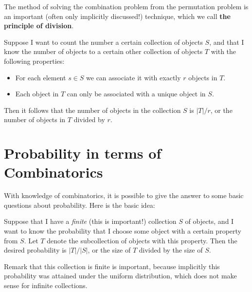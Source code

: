The method of solving the combination problem from the permutation problem is an important (often only implicitly discussed!) technique, which we call \textbf{the principle of division}.

\begin{tcolorbox}
 Suppose I want to count the number a certain collection of objects $S$, and that I know the number of objects to a certain other collection of objects $T$ with the following properties:
 \begin{itemize}
     \item For each element $s \in S$ we can associate it with exactly $r$ objects in $T$.
     \item  Each object in $T$ can only be associated with a unique object in $S$.
 \end{itemize}

Then it follows that the number of objects in the collection $S$ is $|T|/r$, or the number of objects in $T$ divided by $r$.
\end{tcolorbox}

\section{Probability in terms of Combinatorics}

With knowledge of combinatorics, it is possible to give the answer to some basic questions about probability. Here is the basic idea:

\begin{tcolorbox}
 Suppose that I have a \textit{finite} (this is important!) collection $S$ of objects, and I want to know the probability that I choose some object with a certain property from $S$. Let $T$ denote the subcollection of objects with this property. Then the desired probability is $|T|/|S|$, or the size of $T$ divided by the size of $S$.
\end{tcolorbox}
Remark that this collection is finite is important, because implicitly this probability was attained under the uniform distribution, which does not make sense for infinite collections.
